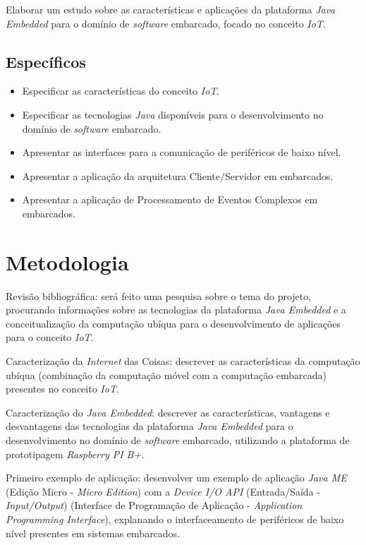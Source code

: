 Elaborar um estudo sobre as características e aplicações da plataforma
\textit{Java Embedded} para o domínio de \textit{software} embarcado, focado no
conceito \textit{IoT}.

\newpage
\subsection{Específicos}

\begin{itemize}

    \item Especificar as características do conceito \textit{IoT}.

    \item Especificar as tecnologias \textit{Java} disponíveis para o
      desenvolvimento no domínio de \textit{software} embarcado.

    \item Apresentar as interfaces para a comunicação de periféricos de baixo
    nível.

    \item Apresentar a aplicação da arquitetura Cliente/Servidor em
    embarcados.

    \item Apresentar a aplicação de Processamento de Eventos Complexos em
    embarcados.

\end{itemize}

\section{Metodologia}

Revisão bibliográfica: será feito uma pesquisa sobre o tema do projeto,
procurando informações sobre as tecnologias da plataforma \textit{Java
  Embedded} e a conceitualização da computação ubíqua para o desenvolvimento de
aplicações para o conceito \textit{IoT}.

Caracterização da \textit{Internet} das Coisas: descrever as características da
computação ubíqua (combinação da computação móvel com a computação embarcada)
presentes no conceito \textit{IoT}.

Caracterização do \textit{Java Embedded}: descrever as características,
vantagens e desvantagens das tecnologias da plataforma \textit{Java Embedded}
para o desenvolvimento no domínio de \textit{software} embarcado, utilizando a
plataforma de prototipagem \textit{Raspberry PI B+}.

Primeiro exemplo de aplicação: desenvolver um exemplo de aplicação \textit{Java
  ME} (Edição Micro - \textit{Micro Edition}) com a \textit{Device I/O API}
(Entrada/Saída - \textit{Input/Output}) (Interface de Programação de Aplicação
- \textit{Application Programming Interface}), explanando o interfaceamento de
periféricos de baixo nível presentes em sistemas embarcados.

